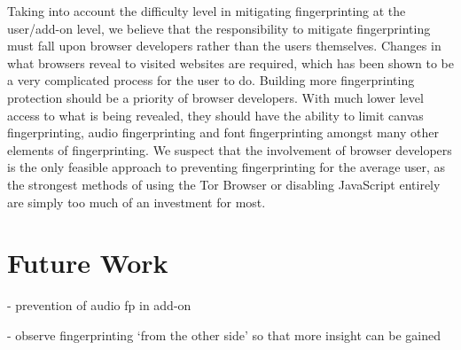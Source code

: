 Taking into account the difficulty level in mitigating fingerprinting at the user/add-on level, we believe that the responsibility to mitigate fingerprinting must fall upon browser developers rather than the users themselves.
Changes in what browsers reveal to visited websites are required, which has been shown to be a very complicated process for the user to do.
Building more fingerprinting protection should be a priority of browser developers.
With much lower level access to what is being revealed, they should have the ability to limit canvas fingerprinting, audio fingerprinting and font fingerprinting amongst many other elements of fingerprinting.
We suspect that the involvement of browser developers is the only feasible approach to preventing fingerprinting for the average user, as the strongest methods of using the Tor Browser or disabling JavaScript entirely are simply too much of an investment for most.

\section{Future Work}

- prevention of audio fp in add-on

- observe fingerprinting `from the other side' so that more insight can be gained

